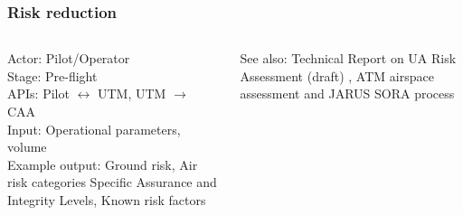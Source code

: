 \documentclass[usenames,dvipsnames,aspectratio=169,serif]{beamer}
\begin{document}
\begin{frame}
   \frametitle{Risk reduction}
   \begin{columns}[t]
      \begin{column}{0.5\textwidth}
         Actor: Pilot/Operator \\
         Stage: Pre-flight \\
         APIs: Pilot $\leftrightarrow$ UTM, UTM $\rightarrow$ CAA \\
         Input: Operational parameters, volume \\
         Example output: Ground risk, Air risk categories Specific Assurance and Integrity Levels, Known risk factors \\
      \end{column}
      \begin{column}{0.5\textwidth}
         See also: Technical Report on UA Risk Assessment (draft) \cite{UARRG-TR-1}, ATM airspace assessment \cite{EASA-UAS-ATM-Assessment-2018} and JARUS SORA process \cite{JARUS-SORA/JAR-DEL-WG6-D.04}
      \end{column}
   \end{columns}
\end{frame}
\end{document}
